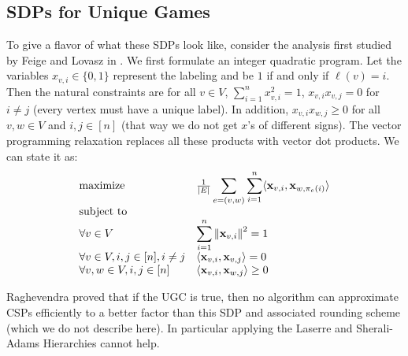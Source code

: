 \documentclass[10pt]{article}
\newcommand{\mbf}[1]{\mathbf{ #1 }}
\begin{document}
\subsection{SDPs for Unique Games}
To give a flavor of what these SDPs look like, consider the analysis first studied by Feige and Lovasz in \cite{sdpforugc}. We first formulate an integer quadratic program. Let the variables $x_{v, i} \in \{0, 1\}$ represent the labeling and be $1$ if and only if $\ell(v) = i$. Then the natural constraints are for all $v \in V$, $\sum_{i = 1}^n x_{v, i}^2 = 1$, $x_{v, i} x_{v, j} = 0$ for $i \neq j$ (every vertex must have a unique label). In addition, $x_{v, i} x_{w, j} \geq 0$ for all $v, w \in V$ and $i, j \in [n]$ (that way we do not get $x$'s of different signs). The vector programming relaxation replaces all these products with vector dot products. We can state it as: \[
\begin{array}{ll@{}ll}
\text{maximize}  &\frac{1}{|E|} \displaystyle\sum\limits_{e = (v, w)} \sum_{i = 1}^{n} \langle \mbf{x}_{v, i}, \mbf{x}_{w, \pi_e(i)}\rangle &\\
\text{subject to}\\
\forall v \in V & \displaystyle\sum\limits_{i = 1}^n \norm{\mbf{x}_{v, i}}^2 = 1 \\
\forall v \in V, i, j \in [n], i \neq j & \langle \mbf{x}_{v, i}, \mbf{x}_{v, j} \rangle = 0 \\
\forall v, w\in V, i, j \in [n] & \langle \mbf{x}_{v, i}, \mbf{x}_{w, j} \rangle \geq 0 \\
\end{array}\\
\]

Raghevendra \cite{optcspalgos} proved that if the UGC is true, then no algorithm can approximate CSPs efficiently to a better factor than this SDP and associated rounding scheme (which we do not describe here). In particular applying the Laserre and Sherali-Adams Hierarchies cannot help.
\end{document}
